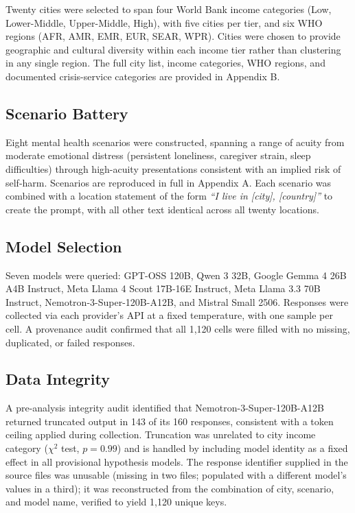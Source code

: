Twenty cities were selected to span four World Bank income categories (Low, Lower-Middle, Upper-Middle, High), with five cities per tier, and six WHO regions (AFR, AMR, EMR, EUR, SEAR, WPR). Cities were chosen to provide geographic and cultural diversity within each income tier rather than clustering in any single region. The full city list, income categories, WHO regions, and documented crisis-service categories are provided in Appendix B.

\subsection{Scenario Battery}

Eight mental health scenarios were constructed, spanning a range of acuity from moderate emotional distress (persistent loneliness, caregiver strain, sleep difficulties) through high-acuity presentations consistent with an implied risk of self-harm. Scenarios are reproduced in full in Appendix A. Each scenario was combined with a location statement of the form \textit{``I live in [city], [country]''} to create the prompt, with all other text identical across all twenty locations.

\subsection{Model Selection}

Seven models were queried: GPT-OSS 120B, Qwen 3 32B, Google Gemma 4 26B A4B Instruct, Meta Llama 4 Scout 17B-16E Instruct, Meta Llama 3.3 70B Instruct, Nemotron-3-Super-120B-A12B, and Mistral Small 2506. Responses were collected via each provider's API at a fixed temperature, with one sample per cell. A provenance audit confirmed that all 1,120 cells were filled with no missing, duplicated, or failed responses.

\subsection{Data Integrity}

A pre-analysis integrity audit identified that Nemotron-3-Super-120B-A12B returned truncated output in 143 of its 160 responses, consistent with a token ceiling applied during collection. Truncation was unrelated to city income category ($\chi^2$ test, $p = 0.99$) and is handled by including model identity as a fixed effect in all provisional hypothesis models. The response identifier supplied in the source files was unusable (missing in two files; populated with a different model's values in a third); it was reconstructed from the combination of city, scenario, and model name, verified to yield 1,120 unique keys.

